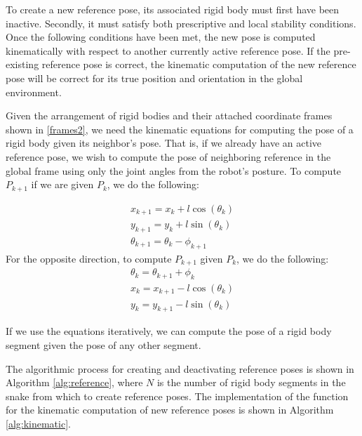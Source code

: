 To create a new reference pose, its associated rigid body must first have been inactive. Secondly, it must satisfy both prescriptive and local stability conditions. Once the following conditions have been met, the new pose is computed kinematically with respect to another currently active reference pose. If the pre-existing reference pose is correct, the kinematic computation of the new reference pose will be correct for its true position and orientation in the global environment.

Given the arrangement of rigid bodies and their attached coordinate frames shown in \autoref{frames2}, we need the kinematic equations for computing the pose of a rigid body given its neighbor's pose. That is, if we already have an active reference pose, we wish to compute the pose of neighboring reference in the global frame using only the joint angles from the robot's posture. To compute $P_{k+1}$ if we are given $P_k$, we do the following:


\begin{equation}
\begin{array}{l}
\displaystyle x_{k+1} = x_k + l \cos(\theta_k) \\
\displaystyle y_{k+1} = y_k + l \sin(\theta_k) \\
\displaystyle \theta_{k+1} = \theta_k - \phi_{k+1}
\end{array}
\label{kinem1}
\end{equation}
For the opposite direction, to compute $P_{k+1}$ given $P_k$, we do the following:
\begin{equation}
\begin{array}{l}
\displaystyle \theta_k = \theta_{k+1} + \phi_k \\
\displaystyle x_k = x_{k+1} - l \cos(\theta_k) \\ 
\displaystyle y_k = y_{k+1} - l \sin(\theta_k)
\end{array}
\label{kinem2}
\end{equation}


If we use the equations iteratively, we can compute the pose of a rigid body segment given the pose of any other segment. 

The algorithmic process for creating and deactivating reference poses is shown in Algorithm \autoref{alg:reference}, where $N$ is the number of rigid body segments in the snake from which to create reference poses. The implementation of the function for the kinematic computation of new reference poses is shown in Algorithm \autoref{alg:kinematic}.

